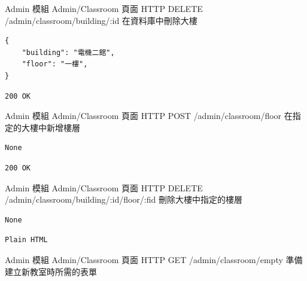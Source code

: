 \documentclass{article}
\begin{document}
{Admin 模組}
{Admin/Classroom 頁面}
{HTTP DELETE}
{/admin/classroom/building/:id}
{在資料庫中刪除大樓}

\bigskip

\begin{lrbox}{\jsoninputbox}
	\begin{lstlisting}[basicstyle=\tiny\ttfamily]
{
	"building": "電機二館",
	"floor": "一樓",
}
\end{lstlisting}
\end{lrbox}

\begin{lrbox}{\jsonoutputbox}
	\begin{lstlisting}
200 OK
\end{lstlisting}
\end{lrbox}

{Admin 模組}
{Admin/Classroom 頁面}
{HTTP POST}
{/admin/classroom/floor}
{在指定的大樓中新增樓層}

\bigskip

\begin{lrbox}{\jsoninputbox}
	\begin{lstlisting}
None
\end{lstlisting}
\end{lrbox}

\begin{lrbox}{\jsonoutputbox}
	\begin{lstlisting}
200 OK
\end{lstlisting}
\end{lrbox}

{Admin 模組}
{Admin/Classroom 頁面}
{HTTP DELETE}
{/admin/classroom/building/:id/floor/:fid}
{刪除大樓中指定的樓層}

\bigskip

\begin{lrbox}{\jsoninputbox}
	\begin{lstlisting}
None
\end{lstlisting}
\end{lrbox}

\begin{lrbox}{\jsonoutputbox}
	\begin{lstlisting}
Plain HTML
\end{lstlisting}
\end{lrbox}

{Admin 模組}
{Admin/Classroom 頁面}
{HTTP GET}
{/admin/classroom/empty}
{準備建立新教室時所需的表單}

\bigskip
\end{document}
